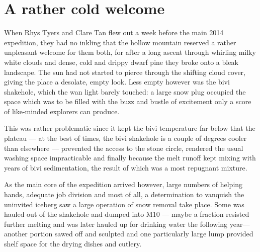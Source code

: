\begin{marginfigure}
\end{marginfigure}

\section{A rather cold welcome}

When Rhys Tyers and Clare Tan flew out a week before the main 2014 expedition, they had no inkling that the hollow mountain reserved a rather unpleasant welcome for them both, for after a long ascent through whirling milky white clouds and dense, cold and drippy dwarf pine they broke onto a bleak landscape. The sun had not started to pierce through the shifting cloud cover, giving the place a desolate, empty look. Less empty however was the bivi shakehole, which the wan light barely touched: a large snow plug occupied the space which was to be filled with the buzz and bustle of excitement only a score of like-minded explorers can produce.

This was rather problematic since it kept the bivi temperature far below that the plateau --- at the best of times, the bivi shakehole is a couple of degrees cooler than elsewhere --- prevented the access to the stone circle, rendered the usual washing space impracticable and finally because the melt runoff kept mixing with years of bivi sedimentation, the result of which was a most repugnant mixture. 

As the main core of the expedition arrived however, large numbers of helping hands, adequate job division and most of all, a determination to vanquish the uninvited iceberg saw a large operation of snow removal take place. Some was hauled out of the shakehole and dumped into M10 --- maybe a fraction resisted further melting and was later hauled up for drinking water the following year--- another portion sawed off and sculpted and one particularly large lump provided shelf space for the drying dishes and cutlery.

